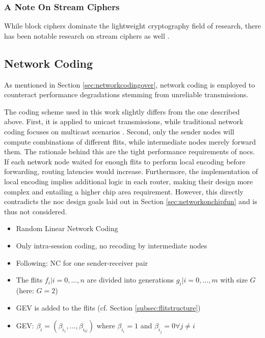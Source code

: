 \subsubsection{A Note On Stream Ciphers}
While block ciphers dominate the lightweight cryptography field of research, there has been notable research on stream ciphers as well
\cite[cf.][]{estream}.

\subsection{Network Coding}\label{sec:designnc}
As mentioned in Section \ref{sec:networkcodingover}, network coding is employed to counteract performance degradations stemming from unreliable
transmissions.

The coding scheme used in this work slightly differs from the one described above. First, it is applied to unicast transmissions, while traditional
network coding focuses on multicast scenarios \cites{ahlswede00networkflow}{li03linearnc}. Second, only the sender nodes will compute combinations of
different flits, while intermediate nodes merely forward them. The rationale behind this are the tight performance requirements of \glspl{noc}. If
each network node waited for enough flits to perform local encoding before forwarding, routing latencies would increase. Furthermore, the
implementation of local encoding implies additional logic in each router, making their design more complex and entailing a higher chip area
requirement. However, this directly contradicts the \gls{noc} design goals laid out in Section \ref{sec:networkonchipfun} and is thus not considered.

\begin{itemize}
    \item Random Linear Network Coding
    \item Only intra-session coding, no recoding by intermediate nodes
    \item Following: NC for one sender-receiver pair
    \item The flits $f_i | i = 0, …, n$ are divided into generations $g_i | i = 0, …, m$ with size $G$ (here: $G = 2$)
    \item GEV is added to the flits (cf. Section \ref{subsec:flitstructure})
    \item GEV: $\beta_i = (\beta_{i_1}, …, \beta_{i_G})$ where $\beta_{i_i} = 1$ and $\beta_{i_j} = 0 \forall j \neq i$ %
\end{itemize}


